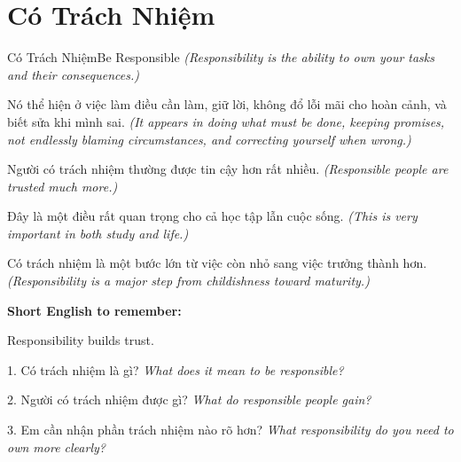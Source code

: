 \section{Có Trách Nhiệm}
\begin{truyen}{Có Trách Nhiệm}{Be Responsible}
\textit{(Responsibility is the ability to own your tasks and their consequences.)}

Nó thể hiện ở việc làm điều cần làm, giữ lời, không đổ lỗi mãi cho hoàn cảnh, và biết sửa khi mình sai.
\textit{(It appears in doing what must be done, keeping promises, not endlessly blaming circumstances, and correcting yourself when wrong.)}

Người có trách nhiệm thường được tin cậy hơn rất nhiều.
\textit{(Responsible people are trusted much more.)}

Đây là một điều rất quan trọng cho cả học tập lẫn cuộc sống.
\textit{(This is very important in both study and life.)}
\end{truyen}

\begin{baihoc}
Có trách nhiệm là một bước lớn từ việc còn nhỏ sang việc trưởng thành hơn.
\textit{(Responsibility is a major step from childishness toward maturity.)}
\end{baihoc}

\begin{ghinhoanh}
\textbf{Short English to remember:}

Responsibility builds trust.

\end{ghinhoanh}

\begin{tuhocnhanh}
1. Có trách nhiệm là gì? \textit{What does it mean to be responsible?}

2. Người có trách nhiệm được gì? \textit{What do responsible people gain?}

3. Em cần nhận phần trách nhiệm nào rõ hơn? \textit{What responsibility do you need to own more clearly?}
\end{tuhocnhanh}
\ngancach

